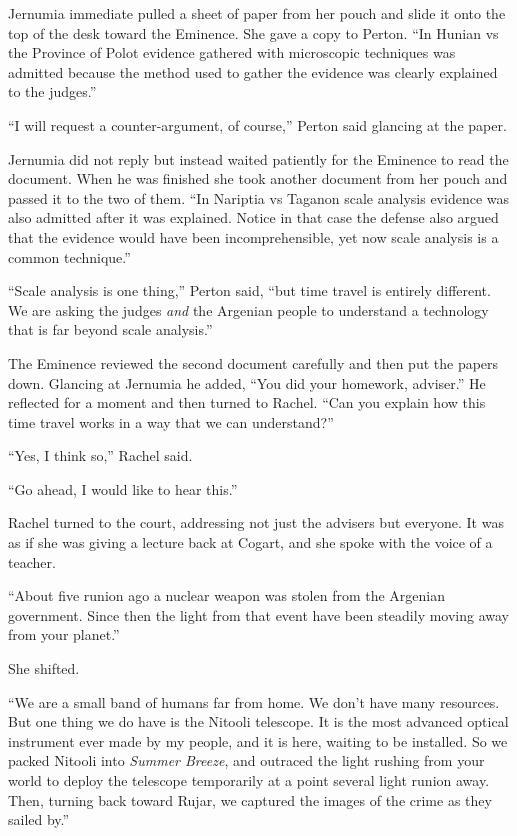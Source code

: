 Jernumia immediate pulled a sheet of paper from her pouch and slide it onto the top of the desk
toward the Eminence. She gave a copy to Perton. ``In Hunian vs the Province of Polot evidence
gathered with microscopic techniques was admitted because the method used to gather the evidence
was clearly explained to the judges.''

``I will request a counter-argument, of course,'' Perton said glancing at the paper.

Jernumia did not reply but instead waited patiently for the Eminence to read the document. When
he was finished she took another document from her pouch and passed it to the two of them. ``In
Nariptia vs Taganon scale analysis evidence was also admitted after it was explained. Notice in
that case the defense also argued that the evidence would have been incomprehensible, yet now
scale analysis is a common technique.''

``Scale analysis is one thing,'' Perton said, ``but time travel is entirely different. We are
asking the judges \emph{and} the Argenian people to understand a technology that is far
beyond scale analysis.''

The Eminence reviewed the second document carefully and then put the papers down. Glancing at
Jernumia he added, ``You did your homework, adviser.'' He reflected for a moment and then turned
to Rachel. ``Can you explain how this time travel works in a way that we can understand?''

``Yes, I think so,'' Rachel said.

``Go ahead, I would like to hear this.''

Rachel turned to the court, addressing not just the advisers but everyone. It was as if she was
giving a lecture back at Cogart, and she spoke with the voice of a teacher.

``About five runion ago a nuclear weapon was stolen from the Argenian government. Since then the
light from that event have been steadily moving away from your planet.''

She shifted.

``We are a small band of humans far from home. We don't have many resources. But one thing we do
have is the Nitooli telescope. It is the most advanced optical instrument ever made by my
people, and it is here, waiting to be installed. So we packed Nitooli into \textit{Summer
  Breeze}, and outraced the light rushing from your world to deploy the telescope temporarily at
a point several light runion away. Then, turning back toward Rujar, we captured the images of
the crime as they sailed by.''

